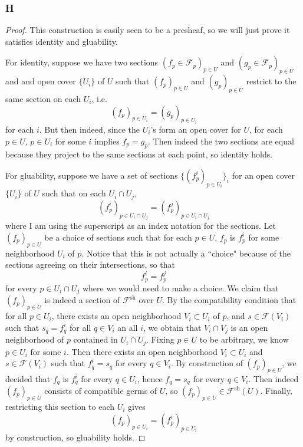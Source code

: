 \documentclass{article}
\newcommand{\fF}{\mathscr{F}}
\begin{document}
\subsubsection{H}\label{2.4.H}
\begin{proof}
    This construction is easily seen to be a presheaf, so we will just prove it satisfies identity and gluability.

    For identity, suppose we have two sections $(f_p\in \fF_p)_{p\in U}$ and $(g_p\in \fF_p)_{p\in U}$ and and open cover $\{U_i\}$ of $U$ such that $(f_p)_{p\in U}$ and $(g_p)_{p\in U}$ restrict to the same section on each $U_i$, i.e.
    \[
    (f_p)_{p\in U_i}=(g_p)_{p\in U_i}
    \]
    for each $i$. But then indeed, since the $U_i$'s form an open cover for $U$, for each $p\in U$, $p\in U_i$ for some $i$ implies $f_p=g_p$. Then indeed the two sections are equal because they project to the same sections at each point, so identity holds.

    For gluability, suppose we have a set of sections $\{(f^i_p)_{p\in U_i}\}_{i}$ for an open cover $\{U_i\}$ of $U$ such that on each $U_i\cap U_j$, 
    \[
    (f^i_p)_{p\in U_i\cap U_j}=(f^j_p)_{p\in U_i\cap U_j}
    \]
    where I am using the superscript as an index notation for the sections. Let $(f_p)_{p\in U}$ be a choice of sections such that for each $p\in U$, $f_p$ is $f^i_p$ for some neighborhood $U_i$ of $p$. Notice that this is not actually a ``choice" because of the sections agreeing on their intersections, so that
    \[
    f^i_p=f^j_p
    \]
    for every $p\in U_i\cap U_j$ where we would need to make a choice.
    We claim that $(f_p)_{p\in U}$ is indeed a section of $\fF^{\text{sh}}$ over $U$. By the compatibility condition that for all $p\in U_i$, there exists an open neighborhood $V_i\subset U_i$ of $p$, and $s\in \fF(V_i)$ such that $s_q=f^i_q$ for all $q\in V_i$ an all $i$, we obtain that $V_i\cap V_j$ is an open neighborhood of $p$ contained in $U_i\cap U_j$. Fixing $p\in U$ to be arbitrary, we know $p\in U_i$ for some $i$. Then there exists an open neighborhood $V_i\subset U_i$ and $s\in \fF(V_i)$ such that $f^i_q=s_q$ for every $q\in V_i$. By construction of $(f_p)_{p\in U}$, we decided that $f_q$ is $f^i_q$ for every $q\in U_i$, hence $f_q=s_q$ for every $q\in V_i$. Then indeed $(f_p)_{p\in U}$ consists of compatible germs of $U$, so $(f_p)_{p\in U}\in \fF^{\text{sh}}(U)$. Finally, restricting this section to each $U_i$ gives
    \[
    (f_p)_{p\in U_i}=(f^i_p)_{p\in U_i}
    \]
    by construction, so gluability holds.
\end{proof}
\end{document}
